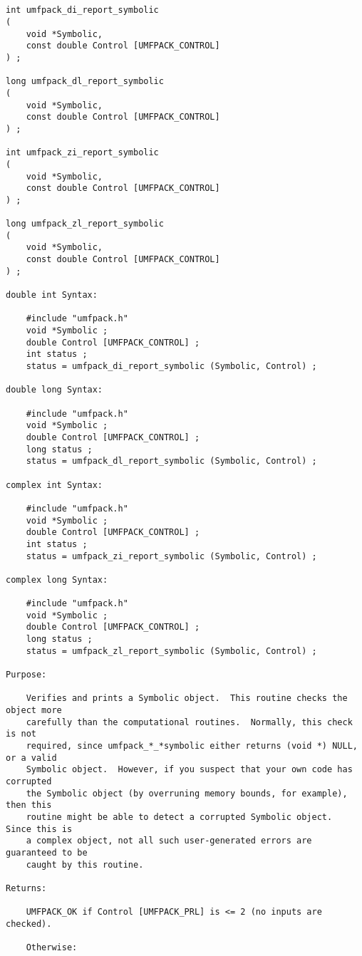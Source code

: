 {\footnotesize
\begin{verbatim}


int umfpack_di_report_symbolic
(
    void *Symbolic,
    const double Control [UMFPACK_CONTROL]
) ;

long umfpack_dl_report_symbolic
(
    void *Symbolic,
    const double Control [UMFPACK_CONTROL]
) ;

int umfpack_zi_report_symbolic
(
    void *Symbolic,
    const double Control [UMFPACK_CONTROL]
) ;

long umfpack_zl_report_symbolic
(
    void *Symbolic,
    const double Control [UMFPACK_CONTROL]
) ;

double int Syntax:

    #include "umfpack.h"
    void *Symbolic ;
    double Control [UMFPACK_CONTROL] ;
    int status ;
    status = umfpack_di_report_symbolic (Symbolic, Control) ;

double long Syntax:

    #include "umfpack.h"
    void *Symbolic ;
    double Control [UMFPACK_CONTROL] ;
    long status ;
    status = umfpack_dl_report_symbolic (Symbolic, Control) ;

complex int Syntax:

    #include "umfpack.h"
    void *Symbolic ;
    double Control [UMFPACK_CONTROL] ;
    int status ;
    status = umfpack_zi_report_symbolic (Symbolic, Control) ;

complex long Syntax:

    #include "umfpack.h"
    void *Symbolic ;
    double Control [UMFPACK_CONTROL] ;
    long status ;
    status = umfpack_zl_report_symbolic (Symbolic, Control) ;

Purpose:

    Verifies and prints a Symbolic object.  This routine checks the object more
    carefully than the computational routines.  Normally, this check is not
    required, since umfpack_*_*symbolic either returns (void *) NULL, or a valid
    Symbolic object.  However, if you suspect that your own code has corrupted
    the Symbolic object (by overruning memory bounds, for example), then this
    routine might be able to detect a corrupted Symbolic object.  Since this is
    a complex object, not all such user-generated errors are guaranteed to be
    caught by this routine.

Returns:

    UMFPACK_OK if Control [UMFPACK_PRL] is <= 2 (no inputs are checked).

    Otherwise:


\end{verbatim}}
